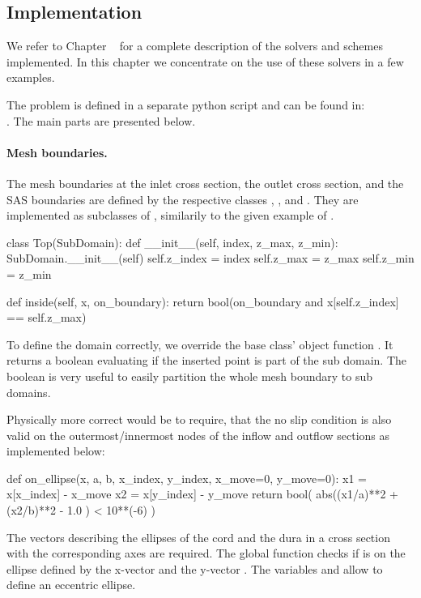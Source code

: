 \subsection{Implementation}
We refer to Chapter ~\cite{NS} for a complete description of the solvers
and schemes implemented. In this chapter we concentrate on the use of
these solvers in a few examples.  

The problem is defined in a separate python script and can be found in: \\
 . The main parts are presented below.

\paragraph{Mesh boundaries.}  The mesh boundaries at the inlet cross section, the outlet cross section, and the SAS boundaries are defined by the respective classes , , and . They are implemented as subclasses of , similarily to the given example of .
\begin{code}
class Top(SubDomain):	
	def __init__(self, index, z_max, z_min):
		SubDomain.__init__(self)
		self.z_index = index
		self.z_max = z_max
		self.z_min = z_min
	
	def inside(self, x, on_boundary):
		return bool(on_boundary and x[self.z_index] == self.z_max)
\end{code}
To define the domain correctly, we override the base class' object function . It returns a boolean evaluating if the inserted point  is part of the sub domain. The boolean  is very useful to easily partition the whole mesh boundary to sub domains. 

Physically more correct would be to require, that the no slip condition is also valid on the outermost/innermost nodes of the inflow and outflow sections as implemented below:
\begin{code}
def on_ellipse(x, a, b, x_index, y_index, x_move=0, y_move=0):
	x1 = x[x_index] - x_move
	x2 = x[y_index] - y_move
	return bool( abs((x1/a)**2 + (x2/b)**2 - 1.0 ) < 10**(-6) )
\end{code}
The vectors describing the ellipses of the cord and the dura in a cross section with the corresponding axes are required. The global function  checks if  is on the ellipse defined by the x-vector  and the y-vector . The variables  and  allow to define an eccentric ellipse. 

